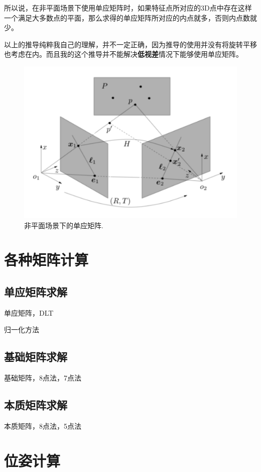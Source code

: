 所以说，在非平面场景下使用单应矩阵时，如果特征点所对应的3D点中存在这样一个满足大多数点的平面，那么求得的单应矩阵所对应的内点就多，否则内点数就少。

\begin{note}
	以上的推导纯粹我自己的理解，并不一定正确，因为推导的使用并没有将旋转平移也考虑在内。而且我的这个推导并不能解决\textbf{低视差}情况下能够使用单应矩阵。
\end{note}

\begin{figure}[h]%
	\centering  %
	\includegraphics[width=0.6\linewidth]{image/Multiview-Geometry-Base/nonplanar_homography.png}  %
	\caption{非平面场景下的单应矩阵.}  %
	\label{fig:nonplanar_homography}   %
\end{figure}



\section{各种矩阵计算}

\subsection{单应矩阵求解}
单应矩阵，DLT

归一化方法
\subsection{基础矩阵求解}
基础矩阵，8点法，7点法
\subsection{本质矩阵求解}

本质矩阵，8点法，5点法

\section{位姿计算}
